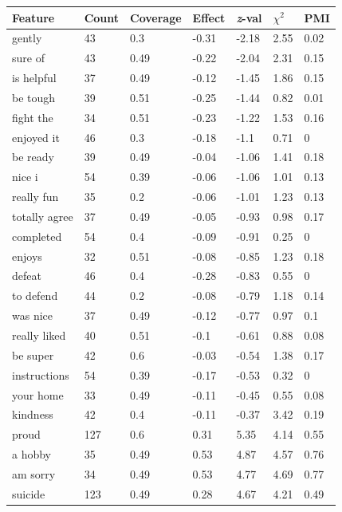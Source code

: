 \begin{table}
\small
\noindent\begin{tabularx}{\textwidth}{>{\hsize=0.15\textwidth}X|XXXXXX}
\toprule
Feature & Count & Coverage & Effect & \textit{z}-val & $\chi^2$ & PMI\\ 
\midrule
gently &  43 &  0.3 &  -0.31 &  -2.18  & 2.55 &  0.02\\
sure of  & 43 &  0.49  & -0.22 &  -2.04 &  2.31 &  0.15\\
is helpful  & 37  & 0.49 &  -0.12  & -1.45  & 1.86 &  0.15\\
be tough  & 39 &  0.51  & -0.25  & -1.44  & 0.82  & 0.01\\
fight the  & 34  & 0.51 &  -0.23 &  -1.22  & 1.53  & 0.16\\
enjoyed it  & 46  & 0.3  & -0.18  & -1.1 &  0.71  & 0\\
be ready  & 39  & 0.49  & -0.04 &  -1.06 &  1.41 &  0.18\\
nice i &  54  & 0.39 &  -0.06  & -1.06  & 1.01 &  0.13\\
really fun &  35  & 0.2 &  -0.06  & -1.01 &  1.23 &  0.13\\
totally agree  & 37  & 0.49  & -0.05 &  -0.93 &  0.98  & 0.17\\
completed &  54 &  0.4 &  -0.09  & -0.91  & 0.25  & 0\\
enjoys  & 32 &  0.51 &  -0.08  & -0.85  & 1.23 &  0.18\\
defeat &  46 &  0.4  &  -0.28  &  -0.83 &  0.55 &  0\\
to defend  & 44 &  0.2 &  -0.08  & -0.79  & 1.18 &  0.14\\
was nice  & 37  & 0.49  & -0.12  & -0.77  & 0.97 &  0.1\\
really liked &  40 &  0.51  & -0.1 &  -0.61 &  0.88 &  0.08\\
be super  & 42 &  0.6  & -0.03 &  -0.54  & 1.38  & 0.17\\
instructions  & 54  & 0.39 &  -0.17  & -0.53 &  0.32 &  0\\
your home &  33 &  0.49 &  -0.11  & -0.45 &  0.55 &  0.08\\
kindness &  42 &  0.4 &  -0.11 &  -0.37 &  3.42 &  0.19\\
\midrule
proud  &  127 &  0.6 &  0.31 &  5.35 &  4.14 &  0.55\\
a hobby  & 35 &  0.49 &  0.53  & 4.87  & 4.57 &  0.76\\
am sorry &  34  & 0.49 &  0.53 &  4.77  & 4.69  & 0.77\\
suicide &  123 &  0.49 &  0.28 &  4.67  & 4.21 &  0.49\\

\end{tabularx}
\end{table}
